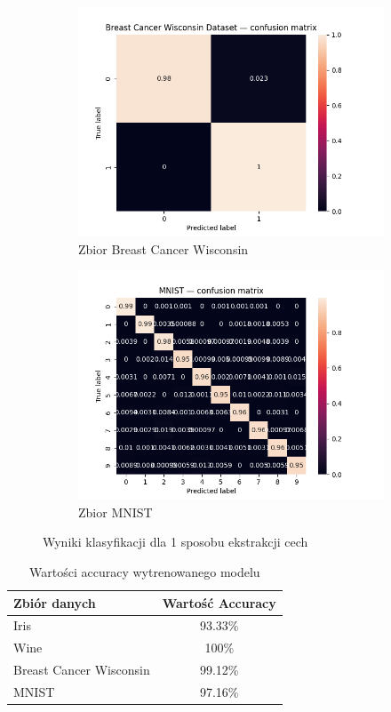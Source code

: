 \documentclass[10pt]{article}
\begin{document}
\begin{figure}[H]
\begin{subfigure}[t]{0.3\textwidth}
        \includegraphics[width=\linewidth]{img/cancer_cm.png}
        \caption{Zbior Breast Cancer Wisconsin}
    \end{subfigure}
    \begin{subfigure}[t]{0.5\textwidth}
        \includegraphics[width=\linewidth]{img/mnist_flat_cm.png}
        \caption{Zbior MNIST}
    \end{subfigure}
    \caption{Wyniki klasyfikacji dla 1 sposobu ekstrakcji cech}
\end{figure}

\begin{table}[H]\centering
    \begin{tabular}{lc}
        \toprule
        Zbiór danych            & Wartość Accuracy \\
        \midrule
        Iris                    & 93.33\%          \\
        Wine                    & 100\%            \\
        Breast Cancer Wisconsin & 99.12\%          \\
        MNIST                   & 97.16\%          \\
        \bottomrule
    \end{tabular}
    \caption{Wartości accuracy wytrenowanego modelu}
\end{table}
\end{document}
